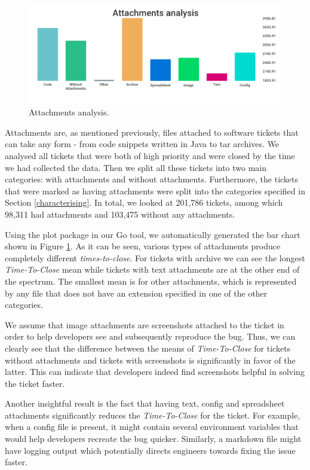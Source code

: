 \documentclass{mpaper}
\begin{document}
\begin{figure}[ht]
  \begin{center}
  \includegraphics[scale=0.25]{images/attachments.png}
  \end{center}
  \caption{\label{attachments}Attachments analysis.}
\end{figure}

Attachments are, as mentioned previously, files attached to software tickets that can take any form - from code 
snippets written in Java to tar archives. We analysed all tickets that were both of high priority and
were closed by the time we had collected the data. Then we split all these tickets into two main categories: 
with attachments and without attachments. Furthermore, the tickets that were marked as having attachments were split 
into the categories specified in Section \ref{characterising}. In total, we looked at 201,786 tickets, among which 
98,311 had attachments and 103,475 without any attachments.

Using the plot package in our Go tool, we automatically generated the bar chart shown in Figure \ref{attachments}. 
As it can be seen, various types of attachments produce completely different \emph{times-to-close}. For 
tickets with archive we can see the longest \emph{Time-To-Close} mean while tickets with text attachments are at 
the other end of the spectrum. The smallest mean is for other attachments, which is represented by any file 
that does not have an extension specified in one of the other categories. 

We assume that image attachments are screenshots attached to the ticket in order to help developers see and 
subsequently reproduce the bug. Thus, we can clearly see that the difference between the means of \emph{Time-To-Close} 
for tickets without attachments and tickets with screenshots is significantly in favor of the latter. This can 
indicate that developers indeed find screenshots helpful in solving the ticket faster.

Another insightful result is the fact that having text, config and spreadsheet attachments significantly 
reduces the \emph{Time-To-Close} for the ticket. For example, when a config file is present, it might contain 
several environment variables that would help developers recreate the bug quicker. Similarly, a markdown file 
might have logging output which potentially directs engineers towards fixing the issue faster.
\end{document}

